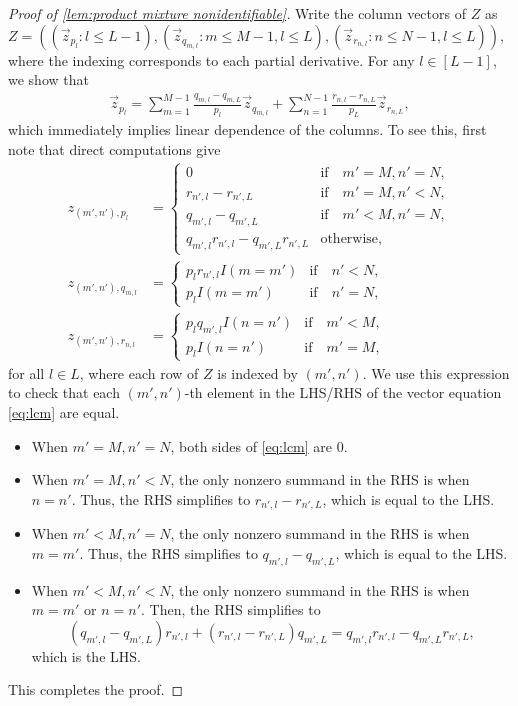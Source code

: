 \documentclass[10pt]{article} %
\begin{document}
\begin{proof}[Proof of \cref{lem:product mixture nonidentifiable}]
    Write the column vectors of $Z$ as $Z = ((\vec{z}_{p_l}: l \le L-1), (\vec{z}_{q_{m,l}}: m \le M-1, l \le L), (\vec{z}_{r_{n,l}}: n \le N-1, l \le L))$, where the indexing corresponds to each partial derivative. For any $l\in[L-1]$, we show that 
    \begin{align}\label{eq:lcm}
        \vec{z}_{p_l} = \sum_{m=1}^{M-1} \frac{q_{m,l}-q_{m,L}}{p_l} \vec{z}_{q_{m,l}} + \sum_{n=1}^{N-1} \frac{r_{n,l}-r_{n,L}}{p_L} \vec{z}_{r_{n,L}},
    \end{align}
    which immediately implies linear dependence of the columns. To see this, first note that direct computations give
    \begin{align*}
        z_{(m', n'), p_{l}} &= \begin{cases}
                0 & \text{if} \quad m' = M, n' = N, \\
                r_{n', l}-r_{n',L} & \text{if} \quad m' = M, n' < N, \\
                q_{m', l}-q_{m',L} & \text{if} \quad m' < M, n'= N, \\
                q_{m', l} r_{n', l}-q_{m',L}r_{n',L} & \text{otherwise},
            \end{cases} \\
        z_{(m', n'), q_{m,l}} &= \begin{cases}
           p_l r_{n', l} I(m = m') & \text{if} \quad n' < N, \\
           p_l I(m = m') & \text{if} \quad n' = N,
        \end{cases} \\
        z_{(m', n'), r_{n,l}} &= \begin{cases}
           p_l q_{m', l} I(n = n') & \text{if} \quad m' <M, \\
           p_l I(n = n') & \text{if} \quad m' = M,
        \end{cases}
    \end{align*}
    for all $l \in L$, where each row of $Z$ is indexed by $(m', n')$. We use this expression to check that each $(m',n')$-th element in the LHS/RHS of the vector equation \eqref{eq:lcm} are equal.
    \begin{itemize}
        \item When $m' = M, n' = N$, both sides of \eqref{eq:lcm} are 0.
        \item When $m' = M, n' < N$, the only nonzero summand in the RHS is when $n = n'$. Thus, the RHS simplifies to $r_{n',l} - r_{n',L}$, which is equal to the LHS.
        \item When $m' < M, n' = N$, the only nonzero summand in the RHS is when $m = m'$. Thus, the RHS simplifies to $q_{m',l} - q_{m',L}$, which is equal to the LHS.
        \item When $m'< M, n'< N$, the only nonzero summand in the RHS is when $m = m'$ or $n = n'$. Then, the RHS simplifies to
        $$(q_{m',l} - q_{m',L}) r_{n',l} + (r_{n',l} - r_{n',L}) q_{m',L} = q_{m',l} r_{n',l} - q_{m',L}r_{n',L},$$
        which is the LHS.
    \end{itemize}
    This completes the proof.    
\end{proof}
\end{document}
